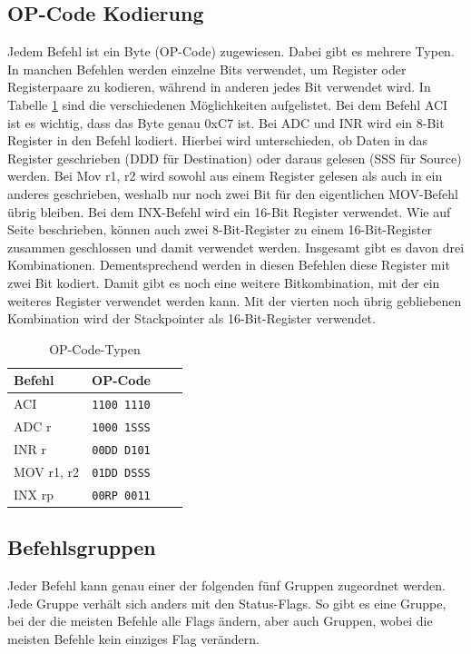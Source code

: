 \documentclass[12pt]{article}
\begin{document}
\subsection{OP-Code Kodierung}
\label{chapter:opcode}
Jedem Befehl ist ein Byte (OP-Code) zugewiesen. Dabei gibt es mehrere Typen. In manchen Befehlen werden einzelne Bits verwendet, um Register oder Registerpaare zu kodieren, während in anderen jedes Bit verwendet wird. In Tabelle \ref{table:opcode} sind die verschiedenen Möglichkeiten aufgelistet. Bei dem Befehl ACI ist es wichtig, dass das Byte genau 0xC7 ist. Bei ADC und INR wird ein 8-Bit Register in den Befehl kodiert. Hierbei wird unterschieden, ob Daten in das Register geschrieben (DDD für Destination) oder daraus gelesen (SSS für Source) werden. Bei Mov r1, r2 wird sowohl aus einem Register gelesen als auch in ein anderes geschrieben, weshalb nur noch zwei Bit für den eigentlichen MOV-Befehl übrig bleiben. Bei dem INX-Befehl wird ein 16-Bit Register verwendet. Wie auf Seite \pageref{RegisterSection} beschrieben, können auch zwei 8-Bit-Register zu einem 16-Bit-Register zusammen geschlossen und damit verwendet werden. Insgesamt gibt es davon drei Kombinationen. Dementsprechend werden in diesen Befehlen diese Register mit zwei Bit kodiert. Damit gibt es noch eine weitere Bitkombination, mit der ein weiteres Register verwendet werden kann. Mit der vierten noch übrig gebliebenen Kombination wird der Stackpointer als 16-Bit-Register verwendet.

\begin{table}[h]
\centering
\begin{tabular}{|l|c|c|c| } 
 \hline
 Befehl & OP-Code \\
 \hline 
 ACI & \texttt{1100 1110} \\ 
 ADC r & \texttt{1000 1SSS} \\
 INR r & \texttt{00DD D101} \\
 MOV r1, r2 & \texttt{01DD DSSS} \\
 INX rp & \texttt{00RP 0011} \\
 \hline
\end{tabular}
\caption{OP-Code-Typen \cite{IntMan30}}
\label{table:opcode}
\end{table}

\subsection{Befehlsgruppen}
Jeder Befehl kann genau einer der folgenden fünf Gruppen zugeordnet werden. Jede Gruppe verhält sich anders mit den Status-Flags. So gibt es eine Gruppe, bei der die meisten Befehle alle Flags ändern, aber auch Gruppen, wobei die meisten Befehle kein einziges Flag verändern.
\\
\end{document}
